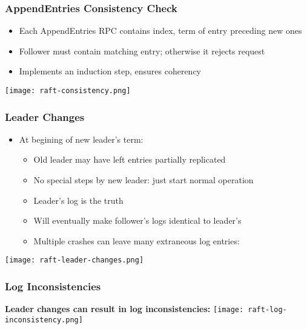 \begin{frame}
    \frametitle{AppendEntries Consistency Check}
    \begin{itemize}
        \item Each AppendEntries RPC contains index, term of entry preceding new ones
        \item Follower must contain matching entry; otherwise it rejects request
        \item Implements an \alert{induction step}, ensures coherency
    \end{itemize}
    \texttt{[image: raft-consistency.png]}
\end{frame}

\begin{frame}
    \frametitle{Leader Changes}
    \begin{itemize}
        \item At begining of new leader's term:
            \begin{itemize}
                \item Old leader may have left entries partially replicated
                \item No special steps by new leader: just start normal operation
                \item Leader's log is \alert{the truth}
                \item Will eventually make follower's logs identical to leader's
                \item Multiple crashes can leave many extraneous log entries:
            \end{itemize}
    \end{itemize}
    \texttt{[image: raft-leader-changes.png]}
\end{frame}

\begin{frame}
    \frametitle{Log Inconsistencies}
    \textbf{Leader changes can result in log inconsistencies:}
    \texttt{[image: raft-log-inconsistency.png]}
\end{frame}

